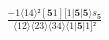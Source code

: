 \documentclass[varwidth, border=5pt]{standalone}
\begin{document}
\begin{my}
$\begin{gathered}
\scriptscriptstyle\frac{-1⟨14⟩²[𝟓1][1|𝟓|𝟓⟩s_{𝟓}}{⟨12⟩⟨23⟩⟨34⟩⟨1|𝟓|1]²}
\end{gathered}$
\end{my}
\end{document}
